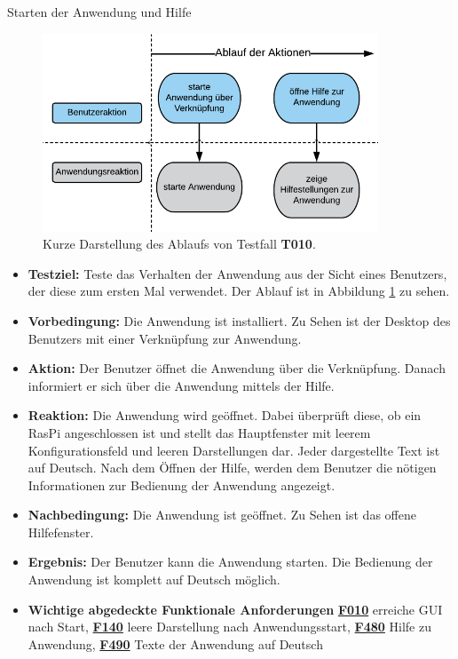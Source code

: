\documentclass[parskip=full]{scrartcl}
\begin{document}
\begin{description} 

\hypertarget{link-t010}{\item[T010]}Starten der Anwendung und Hilfe

\begin{figure}[htbp]
	\begin{center}
		\includegraphics[width = 10cm]{Grafik/T010-Ablauf.png}
		\caption{Kurze Darstellung des Ablaufs von Testfall \textbf{T010}.}
		\label{T010-Ablauf}
	\end{center}
\end{figure}
\begin{itemize}

\item []\textbf{Testziel:} Teste das Verhalten der Anwendung aus der Sicht eines Benutzers, der diese zum ersten Mal verwendet. Der Ablauf ist in Abbildung \ref{T010-Ablauf} zu sehen.

\item []\textbf{Vorbedingung:} Die Anwendung ist installiert. Zu Sehen ist der Desktop des Benutzers mit einer Verknüpfung zur Anwendung.
\item []\textbf{Aktion:} Der Benutzer öffnet die Anwendung über die Verknüpfung. Danach informiert er sich über die Anwendung mittels der Hilfe.
\item []\textbf{Reaktion:} Die Anwendung wird geöffnet. Dabei überprüft diese, ob ein \gls{RasPi} angeschlossen ist und stellt das Hauptfenster mit leerem Konfigurationsfeld und leeren Darstellungen dar. Jeder dargestellte Text ist auf Deutsch. Nach dem Öffnen der Hilfe, werden dem Benutzer die nötigen Informationen zur Bedienung der Anwendung angezeigt.
  
\item []\textbf{Nachbedingung:} Die Anwendung ist geöffnet. Zu Sehen ist das offene Hilfefenster. 

\item []\textbf{Ergebnis:} Der Benutzer kann die Anwendung starten. Die Bedienung der Anwendung ist komplett auf Deutsch möglich.
\item []\textbf{Wichtige abgedeckte Funktionale Anforderungen} \hyperlink{link-f010}{\textbf{F010}} erreiche GUI nach Start, \hyperlink{link-f140}{\textbf{F140}} leere Darstellung nach Anwendungsstart, \hyperlink{link-f480}{\textbf{F480}} Hilfe zu Anwendung, \hyperlink{link-f490}{\textbf{F490}} Texte der Anwendung auf Deutsch


\end{itemize}
\end{description}
\end{document}
